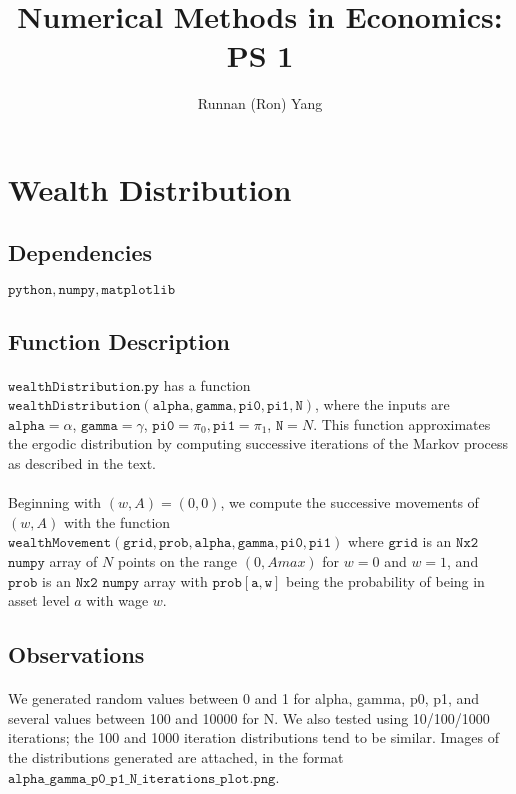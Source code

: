 \documentclass[11pt]{article}
\title{\textbf{Numerical Methods in Economics: PS 1}}
\author{Runnan (Ron) Yang}
\date{}
\begin{document}
\maketitle

\section{Wealth Distribution}
\subsection*{Dependencies} $\mathtt{python, numpy, matplotlib}$

\subsection*{Function Description}
\paragraph{} $\mathtt{wealthDistribution.py}$ has a function $\mathtt{wealthDistribution(alpha, gamma, pi0, pi1, N)}$, where the inputs are $\mathtt{alpha} = \alpha$, $\mathtt{gamma} = \gamma$, $\mathtt{pi0} = \pi_0, \mathtt{pi1} = \pi_1$, $\mathtt{N} = N$. This function approximates the ergodic distribution by computing successive iterations of the Markov process as described in the text.
\paragraph{} Beginning with $(w,A) = (0,0)$, we compute the successive movements of $(w,A)$ with the function \\ $\mathtt{wealthMovement(grid, prob, alpha, gamma, pi0, pi1)}$ where $\mathtt{grid}$ is an $\mathtt{Nx2}$ $\mathtt{numpy}$ array of $N$ points on the range $(0,Amax)$ for $w=0$ and $w=1$, and $\mathtt{prob}$ is an $\mathtt{Nx2}$ $\mathtt{numpy}$ array with $\mathtt{prob[a,w]}$ being the probability of being in asset level $a$ with wage $w$.

\subsection*{Observations}
\paragraph{} We generated random values between 0 and 1 for alpha, gamma, p0, p1, and several values between 100 and 10000 for N. We also tested using 10/100/1000 iterations; the 100 and 1000 iteration distributions tend to be similar. Images of the distributions generated are attached, in the format $\mathtt{alpha\_gamma\_p0\_p1\_N\_iterations\_plot.png}$. 
\end{document}
